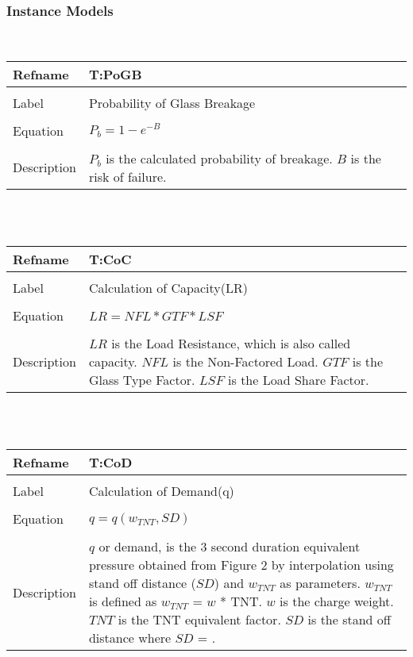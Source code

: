 \documentclass[12pt]{article}
\begin{document}
\subsubsection{Instance Models}
\label{Sec:IMs}
~\newline
\noindent \begin{minipage}{\textwidth}
\begin{tabular}{p{} p{}}
\toprule \textbf{Refname} & \textbf{T:PoGB}
\label{T:PoGB}
\\ \midrule \\
Label & Probability of Glass Breakage
\\ \midrule \\
Equation & $P_{b}=1-e^{-B}$
\\ \midrule \\
Description & $P_{b}$ is the calculated probability of breakage. $B$ is the risk of failure.
\\ \bottomrule \end{tabular}
\end{minipage}\\
~\newline
\noindent \begin{minipage}{\textwidth}
\begin{tabular}{p{} p{}}
\toprule \textbf{Refname} & \textbf{T:CoC}
\label{T:CoC}
\\ \midrule \\
Label & Calculation of Capacity(LR)
\\ \midrule \\
Equation & $LR=NFL*GTF*LSF$
\\ \midrule \\
Description & $LR$ is the Load Resistance, which is also called capacity. $NFL$ is the Non-Factored Load. $GTF$ is the Glass Type Factor. $LSF$ is the Load Share Factor.
\\ \bottomrule \end{tabular}
\end{minipage}\\
~\newline
\noindent \begin{minipage}{\textwidth}
\begin{tabular}{p{} p{}}
\toprule \textbf{Refname} & \textbf{T:CoD}
\label{T:CoD}
\\ \midrule \\
Label & Calculation of Demand(q)
\\ \midrule \\
Equation & $q=q(w_{TNT},SD)$
\\ \midrule \\
Description & $q$ or demand, is the 3 second duration equivalent pressure obtained from Figure 2 by interpolation using stand off distance ($SD$) and $w_{TNT}$ as parameters. $w_{TNT}$ is defined as $w_{TNT}$ = $w$ * TNT. $w$ is the charge weight. $TNT$ is the TNT equivalent factor. $SD$ is the stand off distance where $SD$ = .
\\ \bottomrule \end{tabular}
\end{minipage}\\
\end{document}
